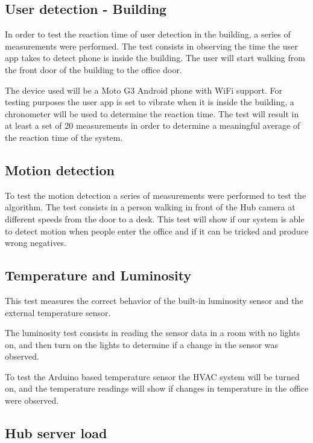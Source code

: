 \subsection{User detection - Building}

In order to test the reaction time of user detection in the building, a series of measurements were performed. The test consists in observing the time the user app takes to detect phone is inside the building. The user will start walking from the front door of the building to the office door.

The device used will be a Moto G3 Android phone with WiFi support.
For testing purposes the user app is set to vibrate when it is inside the building, a chronometer will be used to determine the reaction time. The test will result in at least a set of 20 measurements in order to determine a meaningful average of the reaction time of the system.



\subsection{Motion detection}

To test the motion detection a series of measurements were performed to test the algorithm. The test consists in a person walking in front of the Hub camera at different speeds from the door to a desk. This test will show if our system is able to detect motion when people enter the office and if it can be tricked and produce wrong negatives.




\subsection{Temperature and Luminosity}

This test measures the correct behavior of the built-in luminosity sensor and the external temperature sensor. 

The luminosity test consists in reading the sensor data in a room with no lights on, and then turn on the lights to determine if a change in the sensor was observed.

To test the Arduino based temperature sensor the \ac{HVAC} system will be turned on, and the temperature readings will show if changes in temperature in the office were observed.


\subsection{Hub server load}


